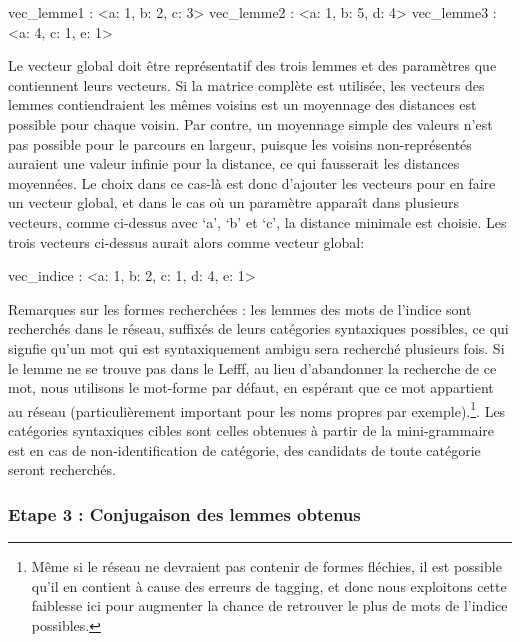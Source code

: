 {\begin{framed}
vec\_lemme1 : \textless{a: 1, b: 2, c: 3}\textgreater \newline
vec\_lemme2 : \textless{a: 1, b: 5, d: 4}\textgreater \newline
vec\_lemme3 : \textless{a: 4, c: 1, e: 1}\textgreater 
\end{framed}

Le vecteur global doit être représentatif des trois lemmes et des paramètres que contiennent leurs vecteurs. Si la matrice complète est utilisée, les vecteurs des lemmes contiendraient les mêmes voisins est un moyennage des distances est possible pour chaque voisin. Par contre, un moyennage simple des valeurs n'est pas possible pour le parcours en largeur, puisque les voisins non-représentés auraient une valeur infinie pour la distance, ce qui fausserait les distances moyennées. Le choix dans ce cas-là est donc d'ajouter les vecteurs pour en faire un vecteur global, et dans le cas où un paramètre apparaît dans plusieurs vecteurs, comme ci-dessus avec \lq{a}\rq{}, \lq{b}\rq{} et \lq{c}\rq{}, la distance minimale est choisie. Les trois vecteurs ci-dessus aurait alors comme vecteur global:

\begin{framed}
vec\_indice : \textless{a: 1, b: 2, c: 1, d: 4, e: 1}\textgreater 
\end{framed}

Remarques sur les formes recherchées : les lemmes des mots de l'indice sont recherchés dans le réseau, suffixés de leurs catégories syntaxiques possibles, ce qui signfie qu'un mot qui est syntaxiquement ambigu sera recherché plusieurs fois. Si le lemme ne se trouve pas dans le Lefff, au lieu d'abandonner la recherche de ce mot, nous utilisons le mot-forme par défaut, en espérant que ce mot appartient au réseau (particulièrement important pour les noms propres par exemple).\footnote{Même si le réseau ne devraient pas contenir de formes fléchies, il est possible qu'il en contient à cause des erreurs de tagging, et donc nous exploitons cette faiblesse ici pour augmenter la chance de retrouver le plus de mots de l'indice possibles.}. Les catégories syntaxiques cibles sont celles obtenues à partir de la mini-grammaire est en cas de non-identification de catégorie, des candidats de toute catégorie seront recherchés.

\subsubsection{Etape 3 : Conjugaison des lemmes obtenus}\label{sec:crossetape3}

}
